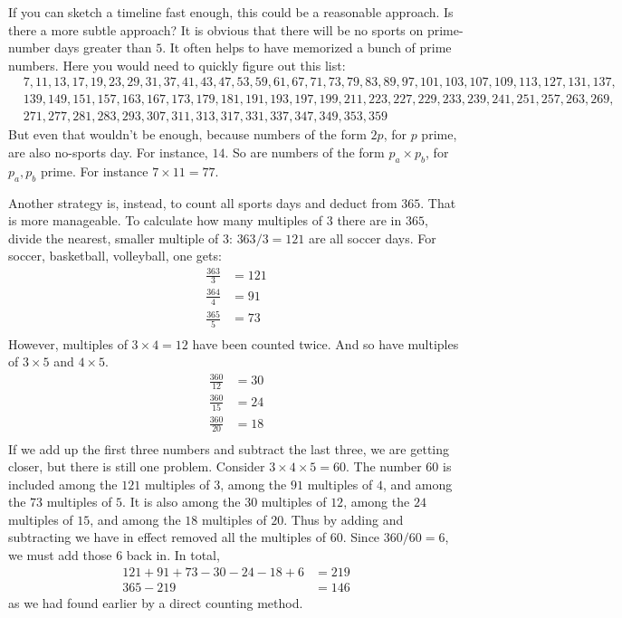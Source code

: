 \documentclass[12pt]{article}
\begin{document}
If you can sketch a timeline fast enough, this could be a reasonable approach. Is there a more subtle approach? It is obvious that there will be no sports on prime-number days greater than $5$. It often helps to have memorized a bunch of prime numbers. Here you would need to quickly figure out this list:
\begin{align*}
&7, 11, 13, 17, 19, 23, 29, 31, 37, 41, 43, 47, 53, 59, 61, 67, 71, 73, 79, 83, 89, 97, 101, 103, 107, 109, 113, 127, 131, 137, \\&139, 149, 151, 157, 163, 167, 173, 179, 181, 191, 193, 197, 199, 211, 223, 227, 229, 233, 239, 241, 251, 257, 263, 269, \\&271, 277, 281, 283, 293, 307, 311, 313, 317, 331, 337, 347, 349, 353, 359
\end{align*}
But even that wouldn't be enough, because numbers of the form $2p$, for $p$ prime, are also no-sports day. For instance, $14$. So are numbers of the form $p_{a} \times p_{b}$, for $p_{a},p_{b}$ prime. For instance $7 \times 11=77$.

Another strategy is, instead, to count all sports days and deduct from $365$. That is more manageable. To calculate how many multiples of $3$ there are in $365$, divide the nearest, smaller multiple of $3$: $363/3=121$ are all soccer days. For soccer, basketball, volleyball, one gets:
\begin{align*}
\frac{363}{3} & = 121 \\
\frac{364}{4} & = 91 \\
\frac{365}{5} & = 73 \\
\end{align*}
However, multiples of $3 \times 4=12$ have been counted twice. And so have multiples of $3 \times 5$ and $4 \times 5$. 
\begin{align*}
\frac{360}{12} & = 30 \\
\frac{360}{15} & = 24 \\
\frac{360}{20} & = 18 \\
\end{align*}
If we add up the first three numbers and subtract the last three, we are getting closer, but there is still one problem. Consider $3 \times 4 \times 5=60$. The number $60$ is included among the $121$ multiples of $3$, among the $91$ multiples of $4$, and among the $73$ multiples of $5$. It is also among the $30$ multiples of $12$, among the $24$ multiples of $15$, and among the $18$ multiples of $20$. Thus by adding and subtracting we have in effect removed all the multiples of $60$. Since $360/60=6$, we must add those $6$ back in. In total,
\begin{align*}
121 + 91 + 73 - 30 - 24 - 18 + 6 & = 219 \\
365 - 219 & = 146
\end{align*}
as we had found earlier by a direct counting method.
\end{document}
